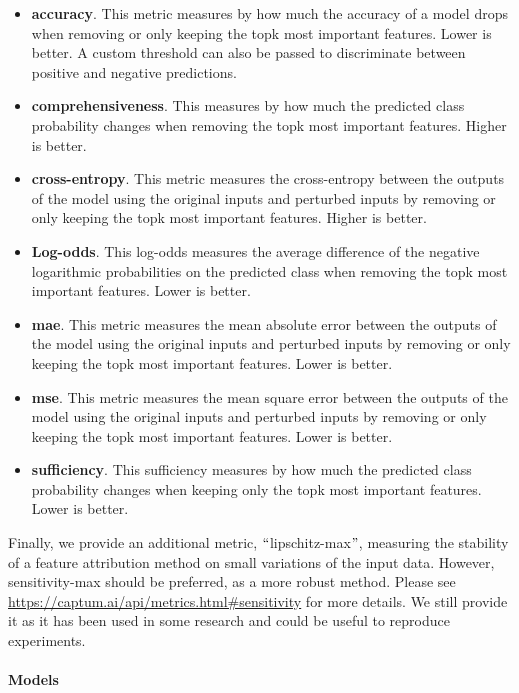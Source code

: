 \begin{itemize}
    \item \textbf{accuracy}.
        This metric measures by how much the accuracy of a model drops when
        removing or only keeping the topk most important features.
        Lower is better.
        A custom threshold can also be passed to discriminate between positive and negative predictions.
    \item \textbf{comprehensiveness}.
        This measures by how much the predicted class probability changes when removing the topk most important
        features.
        Higher is better.
    \item \textbf{cross-entropy}.
        This metric measures the cross-entropy between the outputs of the model using the original inputs and perturbed
        inputs by removing or only keeping the topk most important features.
        Higher is better.
    \item \textbf{Log-odds}.
        This log-odds measures the average difference of the negative logarithmic probabilities on the predicted class
        when removing the topk most important features.
        Lower is better.
    \item \textbf{mae}.
        This metric measures the mean absolute error between the outputs of the model using the original inputs and
        perturbed inputs by removing or only keeping the topk most important features.
        Lower is better.
    \item \textbf{mse}.
        This metric measures the mean square error between the outputs of the model using the original inputs and
        perturbed inputs by removing or only keeping the topk most important features.
        Lower is better.
    \item \textbf{sufficiency}.
        This sufficiency measures by how much the predicted class probability changes when keeping only the topk most
        important features.
        Lower is better.
\end{itemize}

Finally, we provide an additional metric, $``$lipschitz-max$"$, measuring the stability of a feature attribution method
on small variations of the input data.
However, sensitivity-max should be preferred, as a more robust method.
Please see \url{https://captum.ai/api/metrics.html#sensitivity} for more details.
We still provide it as it has been used in some research and could be useful to reproduce experiments.


\paragraph{Models}


